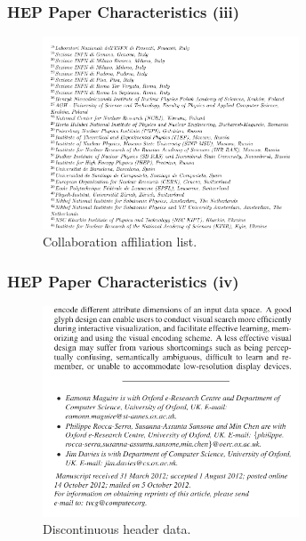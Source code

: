 \documentclass{beamer}
\begin{document}

\begin{frame}
\frametitle{HEP Paper Characteristics (iii)}
\begin{figure}[h]
\center
\includegraphics[width=3in]{Figures/affiliations.pdf}
\caption{Collaboration affiliation list.}
\end{figure}
\end{frame}



\begin{frame}
\frametitle{HEP Paper Characteristics (iv)}
\begin{figure}[h]
\center
\includegraphics[width=3in]{Figures/eamonn.pdf}
\caption{Discontinuous header data.}
\end{figure}
\end{frame}

\end{document}
